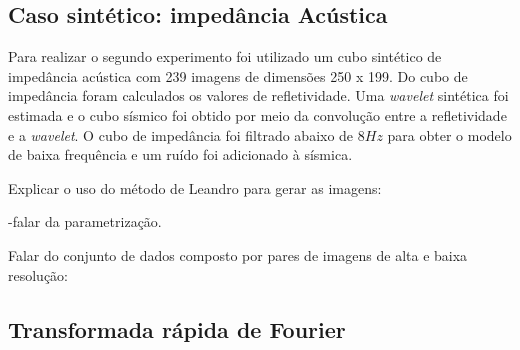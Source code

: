 \subsection{Caso sintético: impedância Acústica}
Para realizar o segundo experimento foi utilizado um cubo sintético de impedância
acústica com 239 imagens de dimensões 250 x 199. Do cubo de impedância foram calculados os
valores de refletividade. Uma \textit{wavelet}
sintética foi estimada e o cubo sísmico foi obtido por meio da
convolução entre a refletividade e a \textit{wavelet}.
O cubo de impedância foi filtrado abaixo de $8Hz$ para obter o modelo de baixa frequência e
um ruído foi adicionado à sísmica.

Explicar o uso do método de Leandro para gerar as imagens:


-falar da parametrização.

Falar do conjunto de dados composto por pares de imagens de alta e baixa resolução:

\subsection{Transformada rápida de Fourier}

